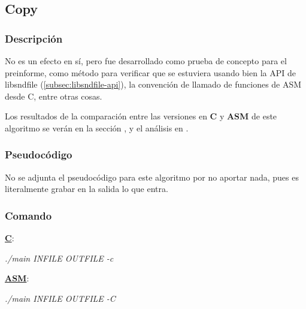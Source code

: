 \subsection{Copy}
\label{subsec:desarrollo-copy}

\subsubsection{Descripción}
\label{subsec:desarrollo-copy-desc}

No es un efecto en sí, pero fue desarrollado como prueba de concepto para el preinforme, como método para verificar que se estuviera usando bien la API de libsndfile (\ref{subsec:libsndfile-api}), la convención de llamado de funciones de ASM desde C, entre otras cosas.

\begin{center}
\end{center}

Los resultados de la comparación entre las versiones en \textbf{C} y \textbf{ASM} de este algoritmo se verán en la sección , y el análisis en .

\subsubsection{Pseudocódigo}
\label{subsec:desarrollo-copy-code}

No se adjunta el pseudocódigo para este algoritmo por no aportar nada, pues es literalmente grabar en la salida lo que entra.

\subsubsection{Comando}
\label{subsec:desarrollo-copy-call}

\underline{\textbf{C}}:
\begin{center}
 \textit{./main INFILE OUTFILE -c}
\end{center}

\underline{\textbf{ASM}}:
\begin{center}
 \textit{./main INFILE OUTFILE -C}
\end{center}